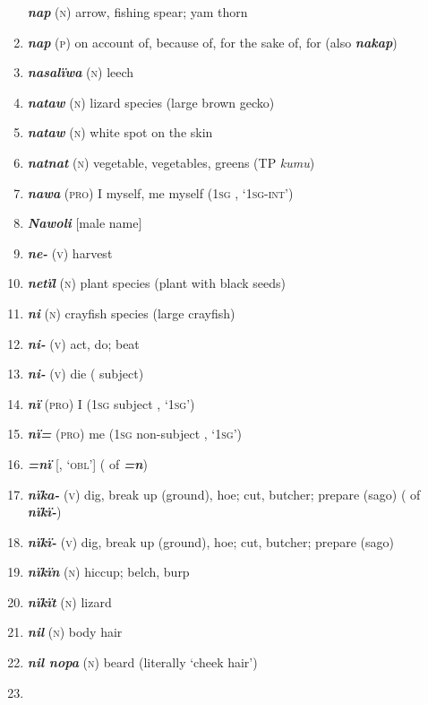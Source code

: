 \begin{enumerate}[noitemsep, label={}, align=left, widest=190, labelsep=1ex,leftmargin=*,itemindent=-10pt]
\textbf{\textit{nap}} (\textsc{n}) arrow, fishing spear; yam thorn \item 
\textbf{\textit{nap}} (\textsc{p}) on account of, because of, for the sake of, for (also \textbf{\textit{nakap}}) \item 
\textbf{\textit{nasalïwa}} (\textsc{n}) leech \item 
\textbf{\textit{nataw}} (\textsc{n}) lizard species (large brown gecko) \item 
\textbf{\textit{nataw}} (\textsc{n}) white spot on the skin \item 
\textbf{\textit{natnat}} (\textsc{n}) vegetable, vegetables, greens (TP \textit{kumu}) \item 
\textbf{\textit{nawa}} (\textsc{pro}) I myself, me myself (1\textsc{sg} , ‘\textsc{1sg-int}’) \item 
\textbf{\textit{Nawoli}} [male name] \item 
\textbf{\textit{ne-}} (\textsc{v}) harvest \item 
\textbf{\textit{netïl}} (\textsc{n}) plant species (plant with black seeds) \item 
\textbf{\textit{ni}} (\textsc{n}) crayfish species (large crayfish) \item 
\textbf{\textit{ni-}} (\textsc{v}) act, do; beat \item 
\textbf{\textit{ni-}} (\textsc{v}) die ( subject) \item 
\textbf{\textit{nï}} (\textsc{pro}) I (1\textsc{sg} subject , ‘\textsc{1sg}’) \item 
\textbf{\textit{nï=}} (\textsc{pro}) me (1\textsc{sg} non-subject , ‘\textsc{1sg}’) \item 
\textbf{\textit{=nï}} [, ‘\textsc{obl}’] ( of \textbf{\textit{=n}}) \item 
\textbf{\textit{nïka-}} (\textsc{v}) dig, break up (ground), hoe; cut, butcher; prepare (sago) (  of \textbf{\textit{nïkï-}}) \item 
\textbf{\textit{nïkï-}} (\textsc{v}) dig, break up (ground), hoe; cut, butcher; prepare (sago) \item 
\textbf{\textit{nïkïn}} (\textsc{n}) hiccup; belch, burp \item 
\textbf{\textit{nïkït}} (\textsc{n}) lizard \item 
\textbf{\textit{nil}} (\textsc{n}) body hair \item 
\textbf{\textit{nil nopa}} (\textsc{n}) beard (literally ‘cheek hair’) \item 

\end{enumerate}
